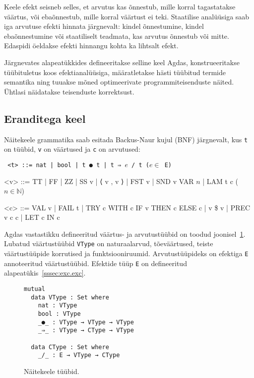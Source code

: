 \documentclass[a4paper,12pt]{article}
\begin{document}
Keele efekt seisneb selles, et arvutus kas õnnestub, mille korral tagastatakse väärtus, või ebaõnnestub, mille korral väärtust ei teki.
Staatilise analüüsiga saab iga arvutuse efekti hinnata järgnevalt: kindel õnnestumine, kindel ebaõnnestumine või staatiliselt teadmata, kas arvutus õnnestub või mitte.
Edaspidi öeldakse efekti hinnangu kohta ka lihtsalt efekt.

Järgnevates alapeatükkides defineeritakse selline keel Agdas,
konstrueeritakse tüübituletus koos efektianalüüsiga,
määratletakse hästi tüübitud termide semantika
ning tuuakse mõned optimeerivate programmiteisenduste näited.
Ühtlasi näidatakse teisenduste korrektsust.

\subsection{Eranditega keel}\label{ssec:exc.raw}

Näitekeele grammatika saab esitada Backus-Naur kujul (BNF) järgnevalt, kus {\tt t} on tüübid, {\tt v} on väärtused ja {\tt c} on arvutused:
\begin{adjustwidth}{1em}{0pt}
\begin{grammar}\tt
<t> ::= nat | bool | t ● t | t ⇒ $e$ / t \hfill ($e \in$ E)
  
<v> ::= TT | FF | ZZ | SS v | ⟨ v , v ⟩ | FST v | SND v
    \alt VAR $n$ | LAM t c \hfill ($n \in \mathbb N$)
  
<c> ::= VAL v | FAIL t | TRY c WITH c
    \alt IF v THEN c ELSE c | v \$ v | PREC v c c | LET c IN c
\end{grammar}
\end{adjustwidth}
Agdas vastastikku defineeritud väärtus- ja arvutustüübid on toodud joonisel~\ref{fig:exc.types}.
Lubatud väärtustüübid {\tt VType} on naturaalarvud, tõeväärtused, teiste väärtustüüpide korrutised ja funktsiooniruumid.
Arvutustüüpideks on efektiga {\tt E} annoteeritud väärtustüübid. Efektide tüüp {\tt E} on defineeritud alapeatükis~\ref{sssec:exc.exc}.
\begin{figure}
  \begin{BVerbatim}
mutual
  data VType : Set where
    nat : VType
    bool : VType
    _●_ : VType → VType → VType
    _⇒_ : VType → CType → VType

  data CType : Set where
    _/_ : E → VType → CType
  \end{BVerbatim}
  \caption{Näitekeele tüübid.}
  \label{fig:exc.types}
\end{figure}
\end{document}
